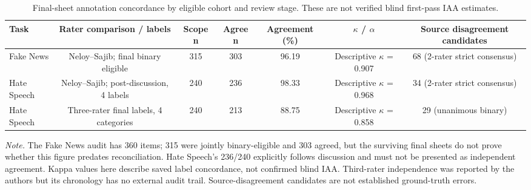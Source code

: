 \begin{table}[t]
\centering
\caption{Final-sheet annotation concordance by eligible cohort and review stage. These are not verified blind first-pass IAA estimates.}
\label{tab:human_iaa}
\footnotesize
\begin{adjustbox}{max width=\linewidth}
\begin{tabular}{lcccccc}
\toprule
Task & Rater comparison / labels & Scope n & Agree n & Agreement (\%) & $\kappa$ / $\alpha$ & Source disagreement candidates \\
\midrule
Fake News & Neloy--Sajib; final binary eligible & 315 & 303 & 96.19 & Descriptive $\kappa$ = 0.907 & 68 (2-rater strict consensus) \\
Hate Speech & Neloy--Sajib; post-discussion, 4 labels & 240 & 236 & 98.33 & Descriptive $\kappa$ = 0.968 & 34 (2-rater strict consensus) \\
Hate Speech & Three-rater final labels, 4 categories & 240 & 213 & 88.75 & Descriptive $\kappa$ = 0.858 & 29 (unanimous binary) \\
\bottomrule
\end{tabular}
\end{adjustbox}
\par\vspace{2pt}
\begin{minipage}{\linewidth}
\scriptsize\emph{Note.} The Fake News audit has 360 items; 315 were jointly binary-eligible and 303 agreed, but the surviving final sheets do not prove whether this figure predates reconciliation. Hate Speech's 236/240 explicitly follows discussion and must not be presented as independent agreement. Kappa values here describe saved label concordance, not confirmed blind IAA. Third-rater independence was reported by the authors but its chronology has no external audit trail. Source-disagreement candidates are not established ground-truth errors.
\end{minipage}
\end{table}

